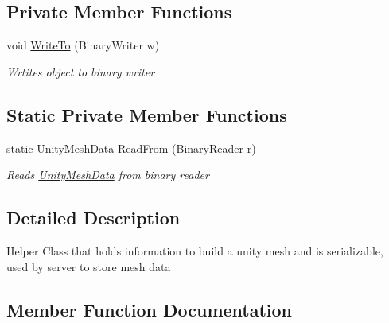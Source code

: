 \subsection*{Private Member Functions}
\begin{DoxyCompactItemize}
\item 
void \mbox{\hyperlink{class_virt_muse_web_1_1_utility_1_1_unity_mesh_data_a87e2e6579f7e627b855616daf715e500}{Write\+To}} (Binary\+Writer w)
\begin{DoxyCompactList}\small\item\em Wrtites object to binary writer \end{DoxyCompactList}\end{DoxyCompactItemize}
\subsection*{Static Private Member Functions}
\begin{DoxyCompactItemize}
\item 
static \mbox{\hyperlink{class_virt_muse_web_1_1_utility_1_1_unity_mesh_data}{Unity\+Mesh\+Data}} \mbox{\hyperlink{class_virt_muse_web_1_1_utility_1_1_unity_mesh_data_a85e372f94563bce9ce66a0f930881607}{Read\+From}} (Binary\+Reader r)
\begin{DoxyCompactList}\small\item\em Reads \mbox{\hyperlink{class_virt_muse_web_1_1_utility_1_1_unity_mesh_data}{Unity\+Mesh\+Data}} from binary reader \end{DoxyCompactList}\end{DoxyCompactItemize}


\subsection{Detailed Description}
Helper Class that holds information to build a unity mesh and is serializable, used by server to store mesh data 



\subsection{Member Function Documentation}
\mbox{\label{class_virt_muse_web_1_1_utility_1_1_unity_mesh_data_a72d47231711a93e536a91a202d07caef}} 

